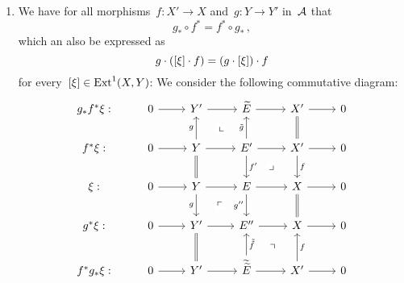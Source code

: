 \begin{remark}
\begin{enumerate}
    \item
      We have for all morphisms~$f \colon X' \to X$ and~$g \colon Y \to Y'$ in~$\mathcal{A}$ that
      \[
        g_* \circ f^*
        =
        f^* \circ g_* \,,
      \]
      which an also be expressed as
      \[
        g \cdot ([\xi] \cdot f)
        =
        (g \cdot [\xi]) \cdot f
      \]
      for every~$[\xi] \in \operatorname{Ext}^1(X,Y)$:
      We consider the following commutative diagram:
      \[
        \begin{tikzcd}
            g_* f^* \xi:
          & 0
            \arrow{r}
          & Y'
            \arrow{r}
          & \widetilde{E}
            \arrow{r}
          & X'
            \arrow{r}
          & 0
          \\
            f^* \xi:
          & 0
            \arrow{r}
          & Y
            \arrow{u}[left]{g}
            \arrow[phantom]{ur}[description]{\llcorner}
            \arrow{r}
            \arrow[equal]{d}
          & E'
            \arrow{u}[left]{\tilde{g}}
            \arrow{r}
            \arrow[phantom]{dr}[description]{\lrcorner}
            \arrow{d}[right]{f'}
          & X'
            \arrow[equal]{u}
            \arrow{r}
            \arrow{d}[right]{f}
          & 0
          \\
            \xi:
          & 0
            \arrow{r}
          & Y
            \arrow{r}
            \arrow[phantom]{dr}[description]{\ulcorner}
            \arrow{d}[left]{g}
          & E
            \arrow{r}
            \arrow{d}[left]{g''}
          & X
            \arrow{r}
            \arrow[equal]{d}
          & 0
          \\
            g^* \xi:
          & 0
            \arrow{r}
          & Y'
            \arrow{r}
          & E''
            \arrow{r}
          & X
            \arrow{r}
          & 0
          \\
            f^* g_* \xi:
          & 0
            \arrow{r}
          & Y'
            \arrow[equal]{u}
            \arrow{r}
          & \widetilde{\widetilde{E}}
            \arrow{u}[right]{\tilde{\tilde{f}}}
            \arrow[phantom]{ur}{\urcorner}
            \arrow{r}
          & X'
            \arrow{u}[right]{f}
            \arrow{r}
          & 0
        \end{tikzcd}
      \]
  \end{enumerate}
  
  
  
  
  
  
  
  
  
  
\end{remark}


